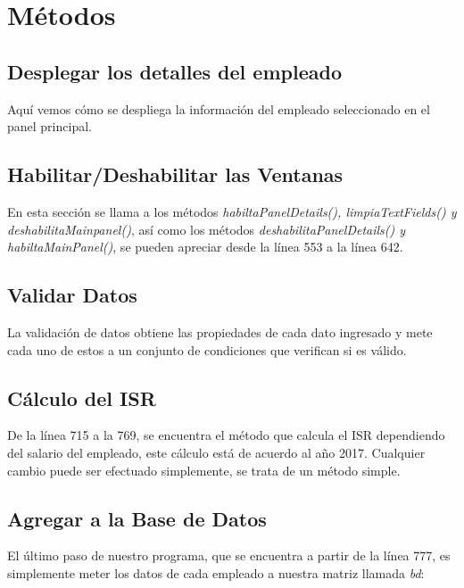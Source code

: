 \documentclass[12pt]{article}
\begin{document}
\section{M\'etodos}
\subsection{Desplegar los detalles del empleado}
{Aqu\'i vemos c\'omo se despliega la informaci\'on del empleado seleccionado en el panel principal.}


\subsection{Habilitar/Deshabilitar las Ventanas}
{En esta secci\'on se llama a los m\'etodos \textit{habiltaPanelDetails(), limpiaTextFields() y deshabilitaMainpanel()}, as\'i como los m\'etodos \textit{deshabilitaPanelDetails() y habiltaMainPanel()}, se pueden apreciar desde la l\'inea 553 a la l\'inea 642.}

\subsection{Validar Datos}
{La validaci\'on de datos obtiene las propiedades de cada dato ingresado y mete cada uno de estos a un conjunto de condiciones que verifican si es v\'alido.}


\subsection{C\'alculo del ISR}
{De la l\'inea 715 a la 769, se encuentra el m\'etodo que calcula el ISR dependiendo del salario del empleado, este c\'alculo est\'a de acuerdo al a\~no 2017. Cualquier cambio puede ser efectuado simplemente, se trata de un m\'etodo simple.}

\subsection{Agregar a la Base de Datos}
{El \'ultimo paso de nuestro programa, que se encuentra a partir de la l\'inea 777, es simplemente meter los datos de cada empleado a nuestra matriz llamada \textit{bd}:}\\


\end{document}
